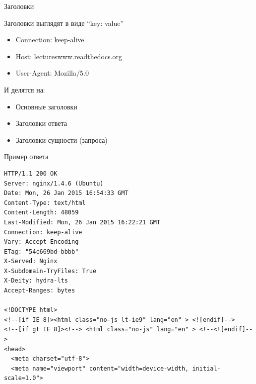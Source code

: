 \begin{frame}{Заголовки}

    Заголовки выглядят в виде ``key: value''

    \begin{itemize}
        \item Connection: keep-alive
        \item Host: lectureswww.readthedocs.org
        \item User-Agent: Mozilla/5.0
    \end{itemize}

    И делятся на:

    \begin{itemize}
        \item Основные заголовки
        \item Заголовки ответа
        \item Заголовки сущности (запроса)
    \end{itemize}

\end{frame}

\begin{frame}[fragile]{Пример ответа}
    \begin{Verbatim}[fontsize=\tiny]
HTTP/1.1 200 OK
Server: nginx/1.4.6 (Ubuntu)
Date: Mon, 26 Jan 2015 16:54:33 GMT
Content-Type: text/html
Content-Length: 48059
Last-Modified: Mon, 26 Jan 2015 16:22:21 GMT
Connection: keep-alive
Vary: Accept-Encoding
ETag: "54c669bd-bbbb"
X-Served: Nginx
X-Subdomain-TryFiles: True
X-Deity: hydra-lts
Accept-Ranges: bytes

<!DOCTYPE html>
<!--[if IE 8]><html class="no-js lt-ie9" lang="en" > <![endif]-->
<!--[if gt IE 8]><!--> <html class="no-js" lang="en" > <!--<![endif]-->
<head>
  <meta charset="utf-8">
  <meta name="viewport" content="width=device-width, initial-scale=1.0">
    \end{Verbatim}
\end{frame}

